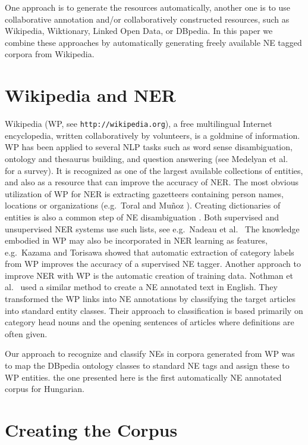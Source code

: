 \documentclass{llncs}
\begin{document}
One approach is to generate the resources automatically, another one is to use
collaborative annotation and/or collaboratively constructed resources, such as
Wikipedia, Wiktionary, Linked Open Data, or DBpedia. In this paper we combine
these approaches by automatically generating freely available NE tagged
corpora from Wikipedia.

\section{Wikipedia and NER}

Wikipedia (WP, see {\tt http://wikipedia.org}), a free
multilingual Internet encyclopedia, written collaboratively by volunteers, is
a goldmine of information.
WP has been applied to several NLP tasks such as word sense
disambiguation, ontology and thesaurus building, and question answering (see
Medelyan et al.~\cite{Medelyan:09} for a survey). It is recognized as one
of the largest available collections of entities, and also as a resource that
can improve the accuracy of NER. The most obvious utilization of WP for NER is
extracting gazetteers containing person names, locations or organizations
(e.g.~Toral and Mu\~noz \cite{Toral:06}). Creating dictionaries of
entities is also a common step of NE disambiguation
\cite{Bunescu:06,Cucerzan:07}. Both supervised and unsupervised NER systems
use such lists, see e.g.~Nadeau et al.~\cite{Nadeau:06} The knowledge
embodied in WP may also be incorporated in NER learning as features,
e.g.~Kazama and Torisawa \cite{Kazama:07} showed that automatic
extraction of category labels from WP improves the accuracy of a supervised NE
tagger.
Another approach to improve NER with WP is the automatic creation of training
data. Nothman et al.~\cite{Nothman:08} used a similar method to create
a NE annotated text in English. They transformed the WP links into NE
annotations by classifying the target articles into standard entity
classes. Their approach to classification is based primarily on category head
nouns and the opening sentences of articles where definitions are often given.

Our approach to recognize and classify NEs in corpora generated from WP was to
map the DBpedia ontology classes to standard NE tags and assign these to WP
entities. the one presented here is the first automatically NE annotated corpus for Hungarian.

\section{Creating the Corpus}
\end{document}
